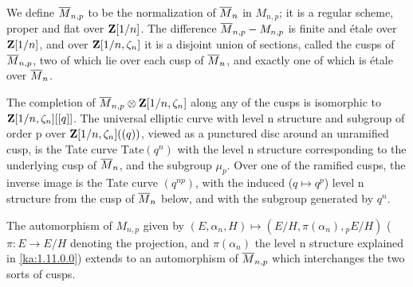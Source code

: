 We define $\overline{M}_{n,p}$ to be the normalization of $\overline{M}_n$ in $M_{n,p}$; it is
a regular scheme, proper and flat over $\mathbf{Z}[1/n]$. The difference
$\overline{M}_{n,p} - M_{n,p}$ is finite and étale over $\mathbf{Z}[1/n]$, and over
$\mathbf{Z}[1/n,\zeta_n]$ it is a disjoint union of sections, called the cusps of
$\overline{M}_{n,p}$, two of which lie over each cusp of $\overline{M}_n$, and exactly one of
which is étale over $\overline{M}_n$.

The completion of $\overline{M}_{n,p}\otimes\mathbf{Z}[1/n,\zeta_n]$ along any of the cusps is
isomorphic to $\mathbf{Z}[1/n,\zeta_n][[q]]$. The universal elliptic curve with level n
structure and subgroup of order p over $\mathbf{Z}[1/n,\zeta_n]((q))$, viewed as a
punctured disc around an unramified cusp, is the Tate curve
$\mathrm{Tate}(q^n)$ with the level n structure corresponding to the underlying
cusp of $\overline{M}_n$, and the subgroup $\mu_p$. Over one of the ramified cusps, the
inverse image is the Tate curve $(q^{np})$, with the induced ($q\mapsto q^p$)
level n structure from the cusp of $\overline{M}_n$ below, and with the subgroup
generated by $q^n$.

The automorphism of $M_{n,p}$ given by
$(E,\alpha_n,H)\mapsto(E/H,\pi(\alpha_n),{}_pE/H)$ ($\pi\colon E\to E/H$
denoting the projection, and $\pi(\alpha_n)$ the level n structure explained in
\eqref{ka:1.11.0.0}) extends to an automorphism of $\overline{M}_{n,p}$ which interchanges the
two sorts of cusps.
